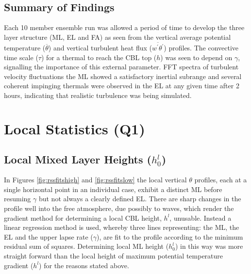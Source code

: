 \subsection{Summary of Findings}

Each 10 member ensemble run was allowed a period of time to develop the three layer structure (\acs{ML}, \acs{EL}
and \acs{FA}) as seen from the vertical average potential temperature ($\overline{\theta}$) and vertical 
turbulent heat flux ($\overline{w^{'}\theta^{'}}$) profiles. The convective time scale ($\tau$) for a thermal 
to reach the \acs{CBL} top ($h$) was seen to depend on $\gamma$, signalling the importance of this external parameter. 
\acs{FFT} spectra of turbulent velocity fluctuations the \acs{ML} showed a satisfactory inertial subrange and several coherent 
impinging thermals were observed in the \acs{EL} at any given time after 2 hours, indicating that 
realistic turbulence was being simulated.\\

\clearpage

\section{Local Statistics (Q1)}
\label{sec:q1}

\subsection{Local Mixed Layer Heights ($h_{0}^{l}$)}
\label{subsec:locmlh}     
\FloatBarrier

In Figures \ref{fig:rssfitshigh} and \ref{fig:rssfitslow} the local vertical $\theta$ profiles,  each at a single horizontal point in an individual case, exhibit a distinct \acs{ML} before resuming $\gamma$ but not always a clearly defined \acs{EL}.  There are sharp changes in the profile well into the free 
atmosphere, due possibly to waves, which render the gradient method for determining a local \acs{CBL} height, $h^{l}$, 
unusable.  Instead a linear regression method is used, whereby three lines representing: the
 \acs{ML}, the \acs{EL} and the upper lapse rate ($\gamma$), are fit to the profile according 
to the minimum residual sum of squares.  Determining local \acs{ML} height ($h_{0}^{l}$) in this way was 
more straight forward than the local height of maximum potential temperature gradient 
($h^{l}$) for the reasons stated above.\\  


